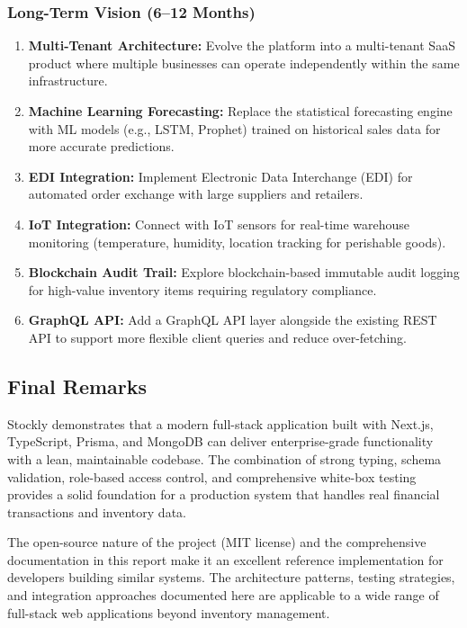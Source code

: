 \documentclass[12pt,onecolumn]{IEEEtran}
\begin{document}
\subsubsection{Long-Term Vision (6--12 Months)}

\begin{enumerate}[leftmargin=1.5em]
  \item \textbf{Multi-Tenant Architecture:} Evolve the platform into a multi-tenant SaaS product where multiple businesses can operate independently within the same infrastructure.
  \item \textbf{Machine Learning Forecasting:} Replace the statistical forecasting engine with ML models (e.g., LSTM, Prophet) trained on historical sales data for more accurate predictions.
  \item \textbf{EDI Integration:} Implement Electronic Data Interchange (EDI) for automated order exchange with large suppliers and retailers.
  \item \textbf{IoT Integration:} Connect with IoT sensors for real-time warehouse monitoring (temperature, humidity, location tracking for perishable goods).
  \item \textbf{Blockchain Audit Trail:} Explore blockchain-based immutable audit logging for high-value inventory items requiring regulatory compliance.
  \item \textbf{GraphQL API:} Add a GraphQL API layer alongside the existing REST API to support more flexible client queries and reduce over-fetching.
\end{enumerate}

\subsection{Final Remarks}

Stockly demonstrates that a modern full-stack application built with Next.js, TypeScript, Prisma, and MongoDB can deliver enterprise-grade functionality with a lean, maintainable codebase. The combination of strong typing, schema validation, role-based access control, and comprehensive white-box testing provides a solid foundation for a production system that handles real financial transactions and inventory data.

The open-source nature of the project (MIT license) and the comprehensive documentation in this report make it an excellent reference implementation for developers building similar systems. The architecture patterns, testing strategies, and integration approaches documented here are applicable to a wide range of full-stack web applications beyond inventory management.
\end{document}
